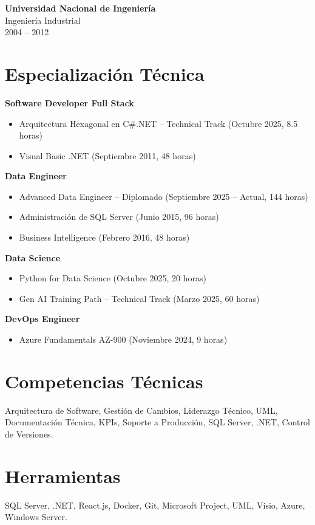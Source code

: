 \documentclass[11pt,a4paper]{article}
\begin{document}
\vspace{0.2cm}

\textbf{Universidad Nacional de Ingeniería} \\
Ingeniería Industrial \\
2004 – 2012

\section*{Especialización Técnica}

\textbf{Software Developer Full Stack}
\begin{itemize}[leftmargin=*]
\item Arquitectura Hexagonal en C\#.NET – Technical Track (Octubre 2025, 8.5 horas)
\item Visual Basic .NET (Septiembre 2011, 48 horas)
\end{itemize}

\textbf{Data Engineer}
\begin{itemize}[leftmargin=*]
\item Advanced Data Engineer – Diplomado (Septiembre 2025 – Actual, 144 horas)
\item Administración de SQL Server (Junio 2015, 96 horas)
\item Business Intelligence (Febrero 2016, 48 horas)
\end{itemize}

\textbf{Data Science}
\begin{itemize}[leftmargin=*]
\item Python for Data Science (Octubre 2025, 20 horas)
\item Gen AI Training Path – Technical Track (Marzo 2025, 60 horas)
\end{itemize}

\textbf{DevOps Engineer}
\begin{itemize}[leftmargin=*]
\item Azure Fundamentals AZ-900 (Noviembre 2024, 9 horas)
\end{itemize}

\section*{Competencias Técnicas}

Arquitectura de Software, Gestión de Cambios, Liderazgo Técnico, UML, Documentación Técnica, KPIs, Soporte a Producción, SQL Server, .NET, Control de Versiones.

\section*{Herramientas}

SQL Server, .NET, React.js, Docker, Git, Microsoft Project, UML, Visio, Azure, Windows Server.
\end{document}
